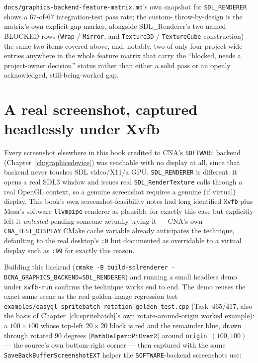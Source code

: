 \texttt{docs/graphics-backend-feature-matrix.md}'s own snapshot for
\texttt{SDL\_RENDERER} shows a 67-of-67 integration-test pass rate; the custom-
throw-by-design is the matrix's own explicit gap marker, alongside SDL\_Renderer's two named
BLOCKED rows (\texttt{Wrap} / \texttt{Mirror}, and \texttt{Texture3D} / \texttt{TextureCube}
construction) --- the same two items covered above, and, notably, two of only four
project-wide entries anywhere in the whole feature matrix that carry the ``blocked, needs a
project-owner decision'' status rather than either a solid pass or an openly acknowledged,
still-being-worked gap.

\section{A real screenshot, captured headlessly under Xvfb}

Every screenshot elsewhere in this book credited to CNA's \texttt{SOFTWARE} backend
(Chapter~\ref{ch:graphicsdevice}) was reachable with no display at all, since that backend
never touches SDL video/X11/a GPU. \texttt{SDL\_RENDERER} is different: it opens a real SDL3
window and issues real \texttt{SDL\_RenderTexture} calls through a real OpenGL context, so a
genuine screenshot requires a genuine (if virtual) display. This book's own screenshot-feasibility
notes had long identified \texttt{Xvfb} plus Mesa's software \texttt{llvmpipe} renderer as
plausible for exactly this case but explicitly left it \emph{untested} pending someone actually
trying it --- CNA's own \texttt{CNA\_TEST\_DISPLAY} CMake cache variable already anticipates the
technique, defaulting to the real desktop's \texttt{:0} but documented as overridable to a
virtual display such as \texttt{:99} for exactly this reason.

Building this backend (\texttt{cmake -B build-sdlrenderer -DCNA\_GRAPHICS\_BACKEND=SDL\_RENDERER})
and running a small headless demo under \texttt{xvfb-run} confirms the technique works end to
end. The demo reuses the exact same scene as the real golden-image regression test
\texttt{examples/easygl\_spritebatch\_rotation\_golden\_test.cpp} (Task~465/417, also the basis
of Chapter~\ref{ch:spritebatch}'s own rotate-around-origin worked example): a
$100\times100$  whose top-left $20\times20$ block is red and the remainder
blue, drawn through  rotated $90$ degrees ($\texttt{MathHelper::PiOver2}$)
around \texttt{origin}~$(100,100)$ --- the source's own bottom-right corner --- then captured
with the same \texttt{SaveBackBufferScreenshotEXT} helper the \texttt{SOFTWARE}-backend
screenshots use:


